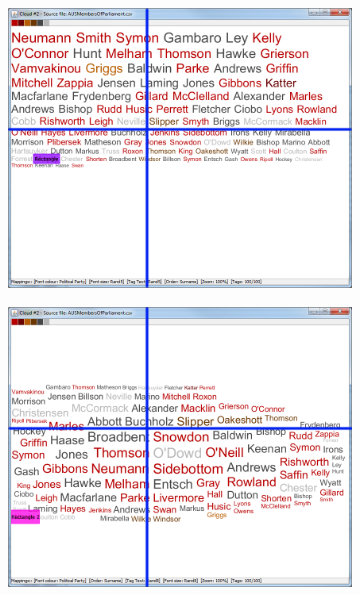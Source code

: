 \begin{figure}[!htb]
\centering
\begin{subfigure}{.5\textwidth}
  \centering
  \includegraphics[scale=0.25]{Experiment1/Trial1/C2S1L2.png}
\end{subfigure}%
\begin{subfigure}{.5\textwidth}
  \centering
  \includegraphics[scale=0.25]{Experiment1/Trial1/C2S1L1.png}
\end{subfigure}
\begin{subfigure}{.5\textwidth}
  \centering

\end{subfigure}
\end{figure}
